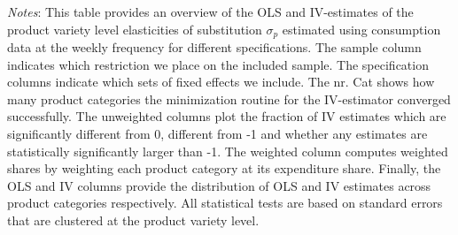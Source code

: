 \begin{landscape}
    \begin{table}[H]
        \centering
        \caption{Weekly Barcode-level Elasticities: Within store instrument}
        \label{tab: app_elas_sigma_cats_weekly}
        \begin{spacing}{1}
        \end{spacing}
        \parbox{1.2\textwidth}{
        \vspace{10pt}
        \begin{spacing}{1} 
            {\footnotesize 
            \textit{Notes}: This table provides an overview of the OLS and IV-estimates of the product variety level elasticities of substitution $\sigma_p$ estimated using consumption data at the weekly frequency for different specifications. The sample column indicates which restriction we place on the included sample. The specification columns indicate which sets of fixed effects we include. The nr. Cat shows how many product categories the minimization routine for the IV-estimator converged successfully. The unweighted columns plot the fraction of IV estimates which are significantly different from 0, different from -1 and whether any estimates are statistically significantly larger than -1. The weighted column computes weighted shares by weighting each product category at its expenditure share. Finally, the OLS and IV columns provide the distribution of OLS and IV estimates across product categories respectively. All statistical tests are based on standard errors that are clustered at the product variety level.}
            \end{spacing}}
    \end{table}
\end{landscape}

